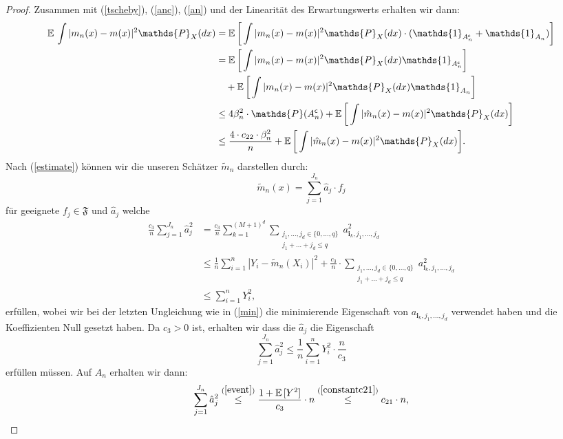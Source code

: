 \begin{proof}
Zusammen mit (\ref{tscheby}), (\ref{anc}), (\ref{an}) und der Linearität des Erwartungswerts erhalten wir dann$\colon$
\begin{equation*}
\begin{split}
\E \int |m_n(x) - m(x)|^2 \mathds{P}_X(dx) & = \E \bigg[\int |m_n(x) - m(x)|^2 \mathds{P}_X(dx) \cdot (\mathds{1}_{A_n^{\mathsf{c}}} + \mathds{1}_{A_n})\bigg] \\
& = \E \bigg[\int |m_n(x) - m(x)|^2 \mathds{P}_X(dx) \mathds{1}_{A_n^{\mathsf{c}}}\bigg] \\
& \quad + \E \bigg[\int |m_n(x) - m(x)|^2 \mathds{P}_X(dx) \mathds{1}_{A_n}\bigg] \\
& \leq 4\beta_n^2 \cdot \mathds{P}(A_n^{\mathsf{c}}) + \E \bigg[\int |\hat{m}_n(x) - m(x)|^2 \mathds{P}_X(dx)\bigg] \\
& \leq \frac{4 \cdot c_{22} \cdot \beta_n^2}{n} + \E \bigg[\int |\hat{m}_n(x) - m(x)|^2 \mathds{P}_X(dx)\bigg].
\end{split}
\end{equation*}
Nach (\ref{estimate}) können wir die unseren Schätzer $\tilde{m}_n$ darstellen durch$\colon$
$$\tilde{m}_n(x) = \sum_{j = 1}^{J_n}\hat{a}_j \cdot f_j$$
für geeignete $f_j \in \mathfrak{F}$ und $\hat{a}_j$ welche 
\begin{equation*}
\begin{split}
\frac{c_3}{n}\sum_{j = 1}^{J_n} \hat{a}_j^2 & = \frac{c_3}{n} \sum_{k = 1}^{(M + 1)^d} \sum_{\substack{ j_1,\dots,j_d \in \{0,\dots,q\} \\j_1+\dots +j_d \leq q}} a_{\mathbf{i}_k,j_1,\dots,j_d}^2 \\
& \leq \frac{1}{n} \sum_{i = 1}^n|Y_i - \tilde{m}_n(X_i)|^2 + \frac{c_3}{n} \cdot \sum_{\substack{ j_1,\dots,j_d \in \{0,\dots,q\} \\j_1+\dots +j_d \leq q}} a_{\mathbf{i}_k,j_1,\dots,j_d}^2 \\
& \leq \sum_{i = 1}^n Y_i^2,
\end{split}
\end{equation*}
erfüllen, wobei wir bei der letzten Ungleichung wie in (\ref{min}) die minimierende Eigenschaft von $a_{\mathbf{i}_k,j_1,\dots,j_d}$ verwendet haben und die Koeffizienten Null gesetzt haben.  Da $c_3 > 0$ ist, erhalten wir dass die $\hat{a}_j$ die Eigenschaft
$$\sum_{j = 1}^{J_n} \hat{a}_j^2  \leq \frac{1}{n}\sum_{i = 1}^n Y_i^2 \cdot \frac{n}{c_3}$$
erfüllen müssen.
Auf $A_n$ erhalten wir dann$\colon$
$$\sum_{j = 1}^{J_n}\hat{a}_j^2 \stackrel{(\ref{event})}{\leq} \frac{1 + \mathbb{E}\,[Y^2]}{c_3} \cdot n \stackrel{(\ref{constantc21})}{\leq} c_{21} \cdot n,$$

\end{proof}
